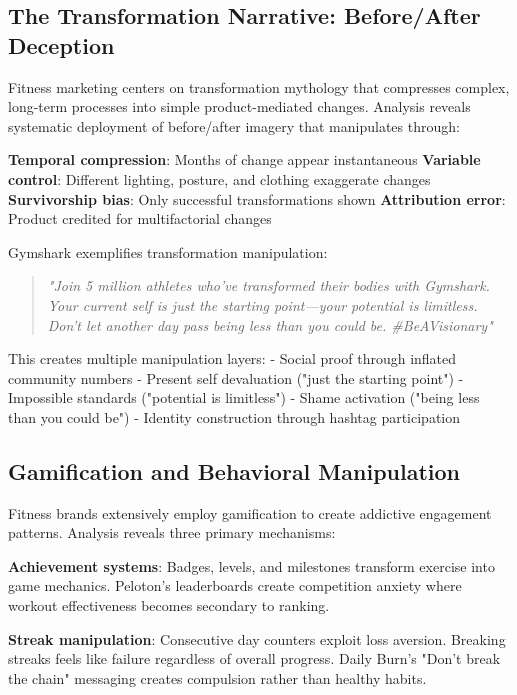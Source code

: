 \subsection{The Transformation Narrative: Before/After Deception}

Fitness marketing centers on transformation mythology that compresses complex, long-term processes into simple product-mediated changes. Analysis reveals systematic deployment of before/after imagery that manipulates through:

\textbf{Temporal compression}: Months of change appear instantaneous
\textbf{Variable control}: Different lighting, posture, and clothing exaggerate changes
\textbf{Survivorship bias}: Only successful transformations shown
\textbf{Attribution error}: Product credited for multifactorial changes

Gymshark exemplifies transformation manipulation:

\begin{quote}
\textit{"Join 5 million athletes who've transformed their bodies with Gymshark. Your current self is just the starting point—your potential is limitless. Don't let another day pass being less than you could be. \#BeAVisionary"}
\end{quote}

This creates multiple manipulation layers:
- Social proof through inflated community numbers
- Present self devaluation ("just the starting point")
- Impossible standards ("potential is limitless")
- Shame activation ("being less than you could be")
- Identity construction through hashtag participation

\subsection{Gamification and Behavioral Manipulation}

Fitness brands extensively employ gamification to create addictive engagement patterns. Analysis reveals three primary mechanisms:

\textbf{Achievement systems}: Badges, levels, and milestones transform exercise into game mechanics. Peloton's leaderboards create competition anxiety where workout effectiveness becomes secondary to ranking.

\textbf{Streak manipulation}: Consecutive day counters exploit loss aversion. Breaking streaks feels like failure regardless of overall progress. Daily Burn's "Don't break the chain" messaging creates compulsion rather than healthy habits.

